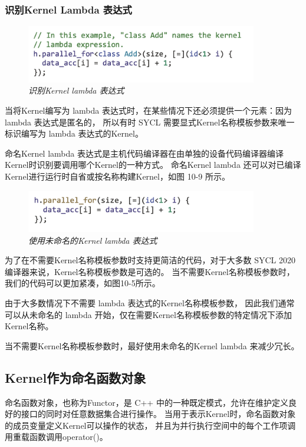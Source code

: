 \subsubsection{识别Kernel Lambda 表达式}
\begin{figure}[H]
	\centering
	\includegraphics[width=0.9\textwidth]{figs/F10.4.png}
	\caption{\textit{识别Kernel lambda 表达式 }}
\end{figure}

当将Kernel编写为 lambda 表达式时，在某些情况下还必须提供一个元素：因为 lambda 表达式是匿名的，
所以有时 SYCL 需要显式Kernel名称模板参数来唯一标识编写为 lambda 表达式的Kernel。

命名Kernel lambda 表达式是主机代码编译器在由单独的设备代码编译器编译Kernel时识别要调用哪个Kernel的一种方式。 
命名Kernel lambda 还可以对已编译Kernel进行运行时自省或按名称构建Kernel，如图 10-9 所示。

\begin{figure}[H]
	\centering
	\includegraphics[width=0.9\textwidth]{figs/F10.5.png}
	\caption{\textit{使用未命名的Kernel lambda 表达式 }}
\end{figure}

为了在不需要Kernel名称模板参数时支持更简洁的代码，对于大多数 SYCL 2020 编译器来说，Kernel名称模板参数是可选的。 
当不需要Kernel名称模板参数时，我们的代码可以更加紧凑，如图10-5所示。

由于大多数情况下不需要 lambda 表达式的Kernel名称模板参数，
因此我们通常可以从未命名的 lambda 开始，仅在需要Kernel名称模板参数的特定情况下添加Kernel名称。

\begin{remark}
	当不需要Kernel名称模板参数时，最好使用未命名的Kernel lambda 来减少冗长。
\end{remark}

\subsection{Kernel作为命名函数对象}
命名函数对象，也称为Functor，是 C++ 中的一种既定模式，允许在维护定义良好的接口的同时对任意数据集合进行操作。 
当用于表示Kernel时，命名函数对象的成员变量定义Kernel可以操作的状态，
并且为并行执行空间中的每个工作项调用重载函数调用operator()。

